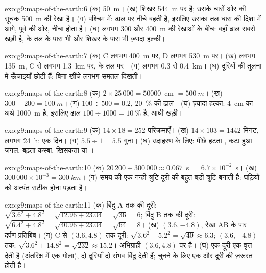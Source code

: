 \begin{solution}{exo:g9:maps-of-the-earth:6}
(क) \qty{50}{m}। (ख) शिखर \qty{544}{m} पर है; उसके चारों ओर की सूचक 
\qty{500}{m} की रेखा है। (ग) पश्चिम में:  ढाल पर नीचे बहती है, इसलिए उसका तल धारा
की दिशा में आगे, पूर्व की ओर, नीचा होता है। (घ) लगभग 300 और \qty{400}{m} की रेखाओं के
बीच: वहाँ ढाल सबसे खड़ी है,  के तल के पास भी और शिखर के पास भी ज़्यादा
हल्की।
\end{solution}

\begin{solution}{exo:g9:maps-of-the-earth:7}
(क) C लगभग \qty{400}{m} पर, D लगभग \qty{530}{m} पर। (ख) लगभग
\qty{135}{m}, C से लगभग \qty{1.3}{km} पर,  के तल पर। (ग) लगभग
0.3 से \qty{0.4}{km}। (घ) दूरियों की तुलना में ऊँचाइयाँ छोटी हैं: बिना खींचे  लगभग
समतल दिखतीं।
\end{solution}

\begin{solution}{exo:g9:maps-of-the-earth:8}
(क) $2 \times 25\,000 = \num{50000}$~cm $= \qty{500}{m}$। (ख) $300 - 200 =
\qty{100}{m}$। (ग) $100 \div 500 = 0.2$, \qty{20}{\%} की ढाल। (घ) ज़्यादा हल्का:
\qty{4}{cm} का अर्थ \qty{1000}{m} है, इसलिए ढाल $100 \div 1000 = \qty{10}{\%}$ है,
आधी खड़ी।
\end{solution}

\begin{solution}{exo:g9:maps-of-the-earth:9}
(क) $14 \times 18 = 252$ परिक्रमाएँ। (ख) $14 \times 103 = 1442$ मिनट, लगभग
\qty{24}{h}: एक दिन। (ग) $5.5 \div 1 = 5.5$ गुना। (घ) उदाहरण के लिए: पीछे हटता
, कटा हुआ जंगल, बढ़ता कस्बा, खिसकता  या ।
\end{solution}

\begin{solution}{exo:g9:maps-of-the-earth:10}
(क) $20\,200 \div 300\,000 \approx 0.067$~s $= 6.7 \times 10^{-2}$~s।
(ख) $300\,000 \times 10^{-3} = \qty{300}{km}$। (ग) समय की एक नन्ही त्रुटि दूरी
की बहुत बड़ी त्रुटि बनाती है: घड़ियों को अत्यंत सटीक होना पड़ता है।
\end{solution}

\begin{solution}{exo:g9:maps-of-the-earth:11}
(क) बिंदु A तक की दूरी: $\sqrt{3.6^2 + 4.8^2} = \sqrt{12.96 + 23.04} =
\sqrt{36} = 6$; बिंदु B तक की दूरी: $\sqrt{6.4^2 + 4.8^2} = \sqrt{40.96 +
23.04} = \sqrt{64} = 8$। (ख) $(3.6, -4.8)$, रेखा AB के पार दर्पण-प्रतिबिंब।
(ग) C से $(3.6, 4.8)$ तक दूरी: $\sqrt{3.6^2 + 5.2^2} =
\sqrt{40} \approx 6.3$; $(3.6, -4.8)$ तक: $\sqrt{3.6^2 + 14.8^2} =
\sqrt{232} \approx 15.2$। अभिग्राही $(3.6, 4.8)$ पर है। (घ) एक दूरी
एक वृत्त देती है (अंतरिक्ष में एक गोला), दो दूरियाँ दो संभव बिंदु देती हैं; चुनने के लिए एक और
दूरी की ज़रूरत होती है।
\end{solution}

